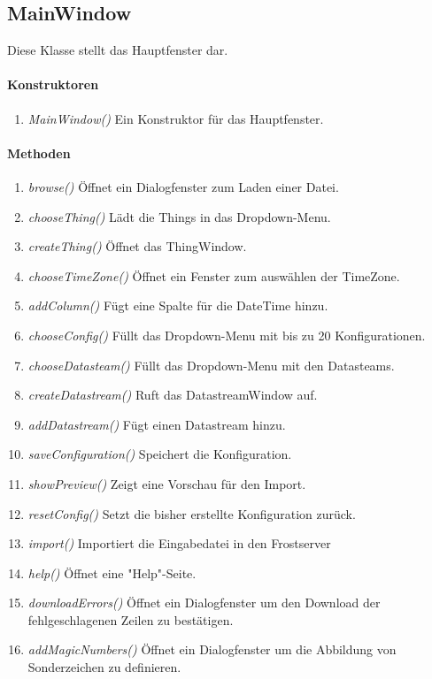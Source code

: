 
\subsection*{MainWindow}\label{MainWindow}
Diese Klasse stellt das Hauptfenster dar. 

\paragraph{Konstruktoren}
\begin{enumerate}[+]
	\item \textit{MainWindow()} Ein Konstruktor für das Hauptfenster.
\end{enumerate}

\paragraph{Methoden}

\begin{enumerate}[+]
	\item \textit{browse()} Öffnet ein Dialogfenster zum Laden einer Datei.
	\item \textit{chooseThing()} Lädt die Things in das Dropdown-Menu.
	\item \textit{createThing()} Öffnet das ThingWindow.
	\item \textit{chooseTimeZone()} Öffnet ein Fenster zum auswählen der TimeZone.
	\item \textit{addColumn()} Fügt eine Spalte für die DateTime hinzu.
	\item \textit{chooseConfig()} Füllt das Dropdown-Menu mit bis zu 20 Konfigurationen.
	\item \textit{chooseDatasteam()} Füllt das Dropdown-Menu mit den Datasteams.
	\item \textit{createDatastream()} Ruft das DatastreamWindow auf.
	\item \textit{addDatastream()} Fügt einen Datastream hinzu.
	\item \textit{saveConfiguration()} Speichert die Konfiguration.
	\item \textit{showPreview()} Zeigt eine Vorschau für den Import.
	\item \textit{resetConfig()} Setzt die bisher erstellte Konfiguration zurück.
	\item \textit{import()} Importiert die Eingabedatei in den Frostserver
	\item \textit{help()} Öffnet eine "{Help}"{-Seite}.
	\item \textit{downloadErrors()} Öffnet ein Dialogfenster um den Download der fehlgeschlagenen Zeilen zu bestätigen.
	\item \textit{addMagicNumbers()} Öffnet ein Dialogfenster um die Abbildung von Sonderzeichen zu definieren.	
\end{enumerate}



